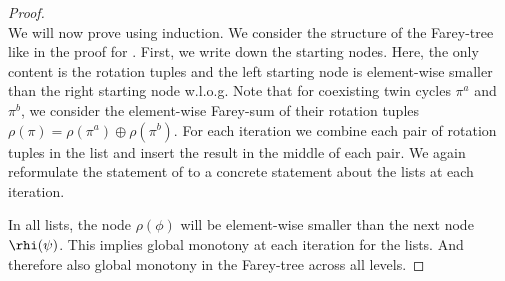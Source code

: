 \begin{proof} \phantom{x} \\
	We will now prove  using induction.
	We consider the structure of the Farey-tree like in the proof for .
	First, we write down the starting nodes.
	Here, the only content is the rotation tuples and the left starting node is element-wise smaller than the right starting node w.l.o.g.
	Note that for coexisting twin cycles $\pi^a$ and $\pi^b$, we consider the element-wise Farey-sum of their rotation tuples $\rho(\pi) = \rho(\pi^a) \oplus \rho(\pi^b)$.
	For each iteration we combine each pair of rotation tuples in the list and insert the result in the middle of each pair.
	We again reformulate the statement of  to a concrete statement about the lists at each iteration.

	In all lists, the node $\rho(\phi)$ will be element-wise smaller than the next node $\rhi(\psi)$.
	This implies global monotony at each iteration for the lists.
	And therefore also global monotony in the Farey-tree across all levels.


\end{proof}
